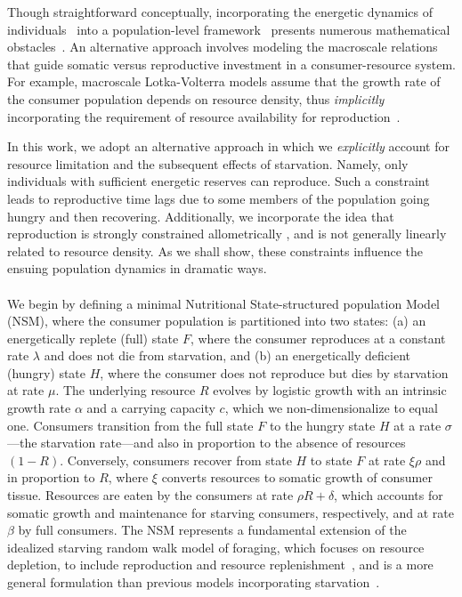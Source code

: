 \documentclass{pnastwo}
\begin{document}
\begin{article}
Though straightforward conceptually, incorporating the energetic dynamics of individuals~\cite{Kooi2000} into a population-level framework~\cite{Kooi2000,Sousa:2010ez} presents numerous mathematical obstacles~\cite{Diekmann:2010da}.
An alternative approach involves modeling the macroscale relations that guide somatic versus reproductive investment in a consumer-resource system.
For example, macroscale Lotka-Volterra models assume that the growth rate of the consumer population depends on resource density, thus \emph{implicitly} incorporating the requirement of resource availability for reproduction~\cite{murdoch:2003}.

In this work, we adopt an alternative approach in which we \emph{explicitly} account for resource limitation and the subsequent effects of starvation.
Namely, only individuals with sufficient energetic reserves can reproduce.
Such a constraint leads to reproductive time lags due to some members of the population going hungry and then recovering.
Additionally, we incorporate the idea that reproduction is strongly constrained allometrically \cite{Kempes:2012hy}, and is not generally linearly related to resource density.
As we shall show, these constraints influence the ensuing population dynamics in dramatic ways.
\\

\\
We begin by defining a minimal Nutritional State-structured population Model (NSM), where the consumer population is partitioned into two states: (a) an energetically replete (full) state $F$, where the consumer reproduces at a constant rate $\lambda$ and does not die from starvation, and (b) an energetically deficient (hungry) state $H$, where the consumer does not reproduce but dies by starvation at rate $\mu$.
The underlying resource $R$ evolves by logistic growth with an intrinsic growth rate $\alpha$ and a carrying capacity $c$, which we non-dimensionalize to equal one.
Consumers transition from the full state $F$ to the hungry state $H$ at a rate $\sigma$---the starvation rate---and also in proportion to the absence of resources $(1-R)$.  Conversely, consumers recover from state $H$ to state $F$ at rate $\xi \rho$ and in proportion to $R$, where $\xi$ converts resources to somatic growth of consumer tissue. %
Resources are eaten by the consumers at rate $\rho R + \delta$, which accounts for somatic growth and maintenance for starving consumers, respectively, and at rate $\beta$ by full consumers.
The NSM represents a fundamental extension of the idealized starving random walk model of foraging, which focuses on resource depletion, to include reproduction and resource replenishment~\cite{Benichou:2014wu,Benichou:2016wl,Chupeau:2016jf}, and is a more general formulation than previous models incorporating starvation~\cite{Persson:1998hz}.


\end{article}
\end{document}
